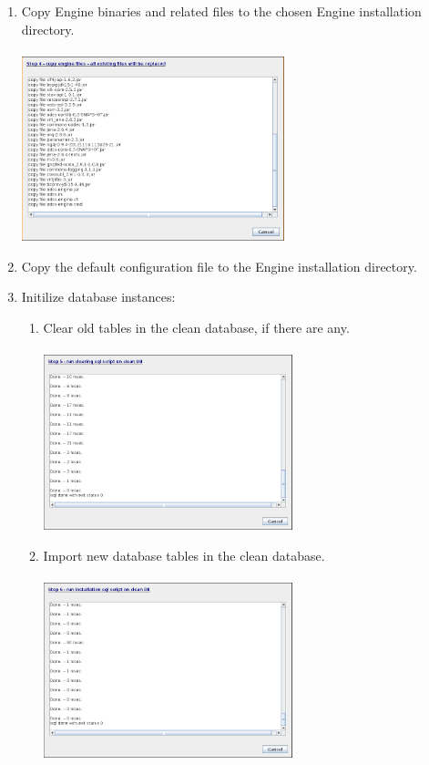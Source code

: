\begin{enumerate}
    \item Copy Engine binaries and related files to the chosen Engine installation directory.
        \\\\  \includegraphics[width=0.6\textwidth]{images/install-step-04.png}
    \item Copy the default configuration file to the Engine installation directory.
    \item Initilize database instances:
        \begin{enumerate}
            \item Clear old tables in the clean database, if there are any.
                \\\\ \includegraphics[width=0.6\textwidth]{images/install-step-05.png}
            \item Import new database tables in the clean database.
                \\\\ \includegraphics[width=0.6\textwidth]{images/install-step-06.png}

\end{enumerate}
\end{enumerate}
